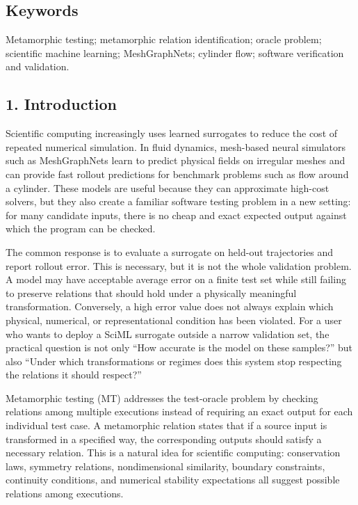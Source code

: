 \subsection{Keywords}\label{keywords}

Metamorphic testing; metamorphic relation identification; oracle
problem; scientific machine learning; MeshGraphNets; cylinder flow;
software verification and validation.

\subsection{1. Introduction}\label{introduction}

Scientific computing increasingly uses learned surrogates to reduce the
cost of repeated numerical simulation. In fluid dynamics, mesh-based
neural simulators such as MeshGraphNets learn to predict physical fields
on irregular meshes and can provide fast rollout predictions for
benchmark problems such as flow around a cylinder. These models are
useful because they can approximate high-cost solvers, but they also
create a familiar software testing problem in a new setting: for many
candidate inputs, there is no cheap and exact expected output against
which the program can be checked.

The common response is to evaluate a surrogate on held-out trajectories
and report rollout error. This is necessary, but it is not the whole
validation problem. A model may have acceptable average error on a
finite test set while still failing to preserve relations that should
hold under a physically meaningful transformation. Conversely, a high
error value does not always explain which physical, numerical, or
representational condition has been violated. For a user who wants to
deploy a SciML surrogate outside a narrow validation set, the practical
question is not only ``How accurate is the model on these samples?'' but
also ``Under which transformations or regimes does this system stop
respecting the relations it should respect?''

Metamorphic testing (MT) addresses the test-oracle problem by checking
relations among multiple executions instead of requiring an exact output
for each individual test case. A metamorphic relation states that if a
source input is transformed in a specified way, the corresponding
outputs should satisfy a necessary relation. This is a natural idea for
scientific computing: conservation laws, symmetry relations,
nondimensional similarity, boundary constraints, continuity conditions,
and numerical stability expectations all suggest possible relations
among executions.


